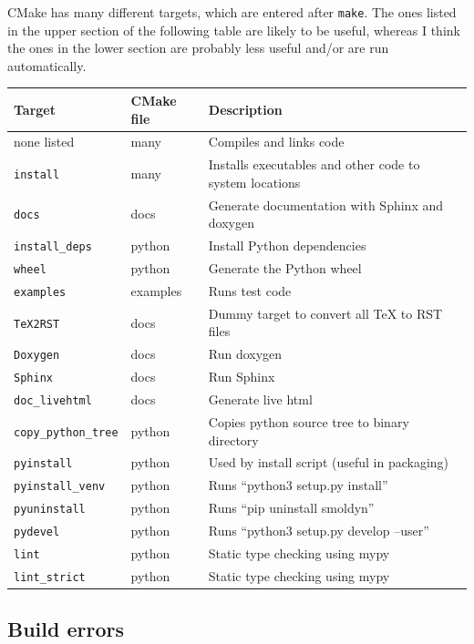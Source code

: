 \documentclass {scrbook}
\newcommand {\ttt} {\texttt}
\begin{document}
CMake has many different targets, which are entered after \ttt{make}. The ones listed in the upper section of the following table are likely to be useful, whereas I think the ones in the lower section are probably less useful and/or are run automatically.

\begin{longtable}[c]{lll}
Target & CMake file & Description\\
\hline
none listed & many & Compiles and links code\\
\ttt{install} & many & Installs executables and other code to system locations\\
\ttt{docs} & docs & Generate documentation with Sphinx and doxygen\\
\ttt{install\_deps} & python & Install Python dependencies\\
\ttt{wheel} & python & Generate the Python wheel\\
\ttt{examples} & examples & Runs test code\\
\hline
\ttt{TeX2RST} & docs & Dummy target to convert all TeX to RST files\\
\ttt{Doxygen} & docs & Run doxygen\\
\ttt{Sphinx} & docs & Run Sphinx\\
\ttt{doc\_livehtml} & docs & Generate live html\\
\ttt{copy\_python\_tree} & python & Copies python source tree to binary directory\\
\ttt{pyinstall} & python & Used by install script (useful in packaging)\\
\ttt{pyinstall\_venv} & python & Runs ``python3 setup.py install''\\
\ttt{pyuninstall} & python & Runs ``pip uninstall smoldyn''\\
\ttt{pydevel} & python & Runs ``python3 setup.py develop --user''\\
\ttt{lint} & python & Static type checking using mypy\\
\ttt{lint\_strict} & python & Static type checking using mypy\\
\end{longtable}

\subsection{Build errors}
\end{document}
